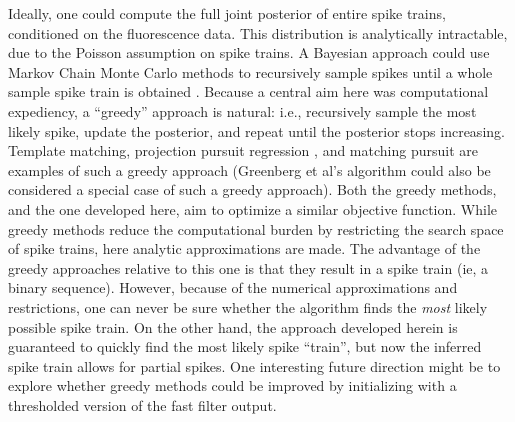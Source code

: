 \documentclass{article}
\newcommand{\foopsi}{fast }
\begin{document}
Ideally, one could compute the full joint posterior of entire spike trains, conditioned on the fluorescence data.  This distribution is analytically intractable, due to the Poisson assumption on spike trains.  A Bayesian approach could use Markov Chain Monte Carlo methods to recursively sample spikes until a whole sample spike train is obtained \cite{AndrieuDoucet01,MishchenkoPaninski09}.  Because a central aim here was computational expediency, a ``greedy'' approach is natural: i.e.,  recursively sample the most likely spike, update the posterior, and repeat until the posterior stops increasing.  Template matching, projection pursuit regression \cite{FS81}, and matching pursuit \cite{MallatZhang93} are examples of such a greedy approach (Greenberg et al's algorithm \cite{GreenbergKerr08} could also be considered a special case of such a greedy approach).  Both the greedy methods, and the one developed here, aim to optimize a similar objective function.  While greedy methods reduce the computational burden by restricting the search space of spike trains, here analytic approximations are made.  The advantage of the greedy approaches relative to this one is that they result in a spike train (ie, a binary sequence).  However, because of the numerical approximations and restrictions, one can never be sure whether the algorithm finds the \emph{most} likely possible spike train.  On the other hand, the approach developed herein is guaranteed to quickly find the most likely spike ``train'', but now the inferred spike train allows for partial spikes.  %
One interesting future direction might be to explore whether greedy methods could be improved by initializing with a thresholded version of the \foopsi filter output. 
\end{document}
